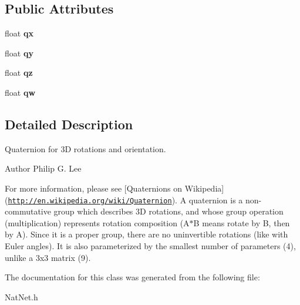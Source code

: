 \subsection*{\-Public \-Attributes}
\begin{DoxyCompactItemize}
\item 
\hypertarget{classQuaternion4f_a208cbe631cfe16038f1d503930270782}{float {\bfseries qx}}\label{classQuaternion4f_a208cbe631cfe16038f1d503930270782}

\item 
\hypertarget{classQuaternion4f_aa435b48549c54a01e6f865de593dfe99}{float {\bfseries qy}}\label{classQuaternion4f_aa435b48549c54a01e6f865de593dfe99}

\item 
\hypertarget{classQuaternion4f_a1723371c7009c98871b1d69bab595308}{float {\bfseries qz}}\label{classQuaternion4f_a1723371c7009c98871b1d69bab595308}

\item 
\hypertarget{classQuaternion4f_a24b62fee4c923f1b4e4c9e07f9a98a74}{float {\bfseries qw}}\label{classQuaternion4f_a24b62fee4c923f1b4e4c9e07f9a98a74}

\end{DoxyCompactItemize}


\subsection{\-Detailed \-Description}
\-Quaternion for 3\-D rotations and orientation. 

\begin{DoxyAuthor}{\-Author}
\-Philip \-G. \-Lee
\end{DoxyAuthor}
\-For more information, please see \mbox{[}\-Quaternions on \-Wikipedia\mbox{]}(\href{http://en.wikipedia.org/wiki/Quaternion}{\tt http\-://en.\-wikipedia.\-org/wiki/\-Quaternion}). \-A quaternion is a non-\/commutative group which describes 3\-D rotations, and whose group operation (multiplication) represents rotation composition (\-A$\ast$\-B means rotate by \-B, then by \-A). \-Since it is a proper group, there are no uninvertible rotations (like with \-Euler angles). \-It is also parameterized by the smallest number of parameters (4), unlike a 3x3 matrix (9). 

\-The documentation for this class was generated from the following file\-:\begin{DoxyCompactItemize}
\item 
\-Nat\-Net.\-h\end{DoxyCompactItemize}
